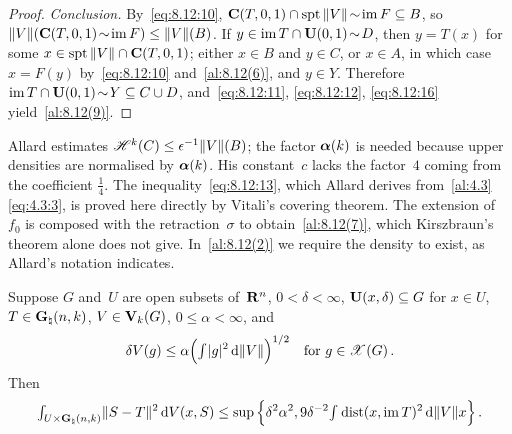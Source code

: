 \begin{proof}
    \emph{Conclusion.} By~\eqref{eq:8.12:10}, $\mathbf{C} ( T, 0, 1 ) \cap \operatorname{spt} \|V\| \!\sim\! \operatorname{im} F
    \subseteq B$, so $\|V\|(\mathbf{C} ( T, 0, 1 ) \!\sim\! \operatorname{im} F) \le \|V\|(B)$. If $y \in \operatorname{im} T \cap
    \mathbf{U}(0,1) \!\sim\! D$, then $y = T(x)$ for some $x \in \operatorname{spt} \|V\| \cap \mathbf{C} ( T, 0, 1 )$;
    either $x \in B$ and $y \in C$, or $x \in A$, in which case $x = F(y)$ by~\eqref{eq:8.12:10}
    and~\ref{al:8.12(6)}, and $y \in Y$. Therefore $\operatorname{im} T \cap \mathbf{U}(0,1) \!\sim\! Y \subseteq C
    \cup D$, and~\eqref{eq:8.12:11}, \eqref{eq:8.12:12}, \eqref{eq:8.12:16} yield~\ref{al:8.12(9)}.
\end{proof}

\begin{remark}
    \label{rem:8.12}
    Allard estimates $\mathscr{H}^{k}(C) \le \epsilon^{-1} \|V\|(B)$; the factor
    $\boldsymbol{\alpha}(k)$ is needed because upper densities are normalised by
    $\boldsymbol{\alpha}(k)$. His constant~$c$ lacks the factor~$4$ coming from the coefficient
    $\frac14$. The inequality~\eqref{eq:8.12:13}, which Allard derives from~\ref{al:4.3}\eqref{eq:4.3:3},
    is proved here directly by Vitali's covering theorem. The extension of $f_0$ is composed with the
    retraction~$\sigma$ to obtain~\ref{al:8.12(7)}, which Kirszbraun's theorem alone does not give.
    In~\ref{al:8.12(2)} we require the density to exist, as Allard's notation indicates.
\end{remark}

\begin{lemma}
    \label{al:8.13}
    Suppose $G$ and~$U$ are open subsets of~$\mathbf{R}^{n}$, $0 < \delta < \infty$, $\mathbf{U}(x,\delta)
    \subseteq G$ for $x \in U$, $T \in \mathbf{G}_{\natural}(n,k)$, $V \in \mathbf{V}_{k}(G)$, $0 \le \alpha <
    \infty$, and
    \begin{displaymath}
        \delta V(g) \le \alpha \Big( {\textstyle\int_{}^{}} |g|^2 \,\mathrm{d} \|V\| \Big)^{1/2} \quad \text{for $g \in
        \mathscr{X}(G)$} \,.
    \end{displaymath}
    Then
    \begin{displaymath}
        {\textstyle\int_{U \times \mathbf{G}_{\natural}(n,k)}^{}} \|S - T\|^2 \,\mathrm{d} V(x,S) \le \sup \Big\{ \delta^2
        \alpha^2, 9 \delta^{-2} {\textstyle\int_{}^{}} \operatorname{dist}(x, \operatorname{im} T)^2 \,\mathrm{d} \|V\| x \Big\} \,.
    \end{displaymath}
\end{lemma}

